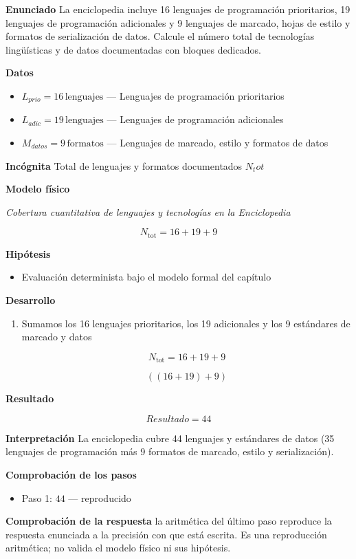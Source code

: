 \documentclass{book}
\begin{document}
\begin{tcolorbox}[title={Problema resuelto}, studiumworked, breakable]

\noindent\textbf{Enunciado}
La enciclopedia incluye 16 lenguajes de programación prioritarios, 19 lenguajes de programación adicionales y 9 lenguajes de marcado, hojas de estilo y formatos de serialización de datos. Calcule el número total de tecnologías lingüísticas y de datos documentadas con bloques dedicados.

\noindent\textbf{Datos}
\begin{itemize}
\item $L_{prio} = 16\,\mathrm{lenguajes}$ — Lenguajes de programación prioritarios
\item $L_{adic} = 19\,\mathrm{lenguajes}$ — Lenguajes de programación adicionales
\item $M_{datos} = 9\,\mathrm{formatos}$ — Lenguajes de marcado, estilo y formatos de datos
\end{itemize}

\noindent\textbf{Incógnita}
Total de lenguajes y formatos documentados \(N_tot\)

\noindent\textbf{Modelo físico}

\noindent\textit{Cobertura cuantitativa de lenguajes y tecnologías en la Enciclopedia}

\[
N_{\text{tot}} = 16 + 19 + 9
\]

\noindent\textbf{Hipótesis}
\begin{itemize}
\item Evaluación determinista bajo el modelo formal del capítulo
\end{itemize}

\noindent\textbf{Desarrollo}
\begin{enumerate}
\item
Sumamos los 16 lenguajes prioritarios, los 19 adicionales y los 9 estándares de marcado y datos

\[
N_{\text{tot}} = 16 + 19 + 9
\]

\[
\left(\left(16+19\right)+9\right)
\]
\end{enumerate}

\noindent\textbf{Resultado}

\[
Resultado = 44
\]

\noindent\textbf{Interpretación}
La enciclopedia cubre 44 lenguajes y estándares de datos (35 lenguajes de programación más 9 formatos de marcado, estilo y serialización).

\noindent\textbf{Comprobación de los pasos}
\begin{itemize}
\item Paso 1: $44$ — reproducido
\end{itemize}

\noindent\textbf{Comprobación de la respuesta} la aritmética del último paso reproduce la respuesta enunciada a la precisión con que está escrita. Es una reproducción aritmética; no valida el modelo físico ni sus hipótesis.
\end{tcolorbox}
\end{document}
